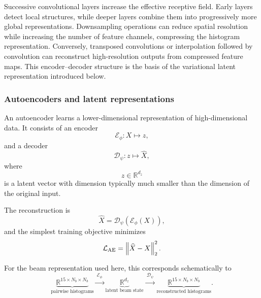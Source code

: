 Successive convolutional layers increase the effective receptive field. Early layers detect local structures, while deeper layers combine them into progressively more global representations. Downsampling operations can reduce spatial resolution while increasing the number of feature channels, compressing the histogram representation. Conversely, transposed convolutions or interpolation followed by convolution can reconstruct high-resolution outputs from compressed feature maps. This encoder--decoder structure is the basis of the variational latent representation introduced below.

\subsubsection{Autoencoders and latent representations}
\label{subsubsec:autoencoder_foundations}

An autoencoder learns a lower-dimensional representation of high-dimensional data. It consists of an encoder
\begin{equation}
    \mathcal{E}_{\phi}
    :
    X
    \longmapsto
    z,
\end{equation}
and a decoder
\begin{equation}
    \mathcal{D}_{\psi}
    :
    z
    \longmapsto
    \widehat{X},
\end{equation}
where
\begin{equation}
    z\in\mathbb{R}^{d_z}
\end{equation}
is a latent vector with dimension typically much smaller than the dimension of the original input.

The reconstruction is
\begin{equation}
    \widehat{X}
    =
    \mathcal{D}_{\psi}
    \left(
    \mathcal{E}_{\phi}(X)
    \right),
\end{equation}
and the simplest training objective minimizes
\begin{equation}
    \mathcal{L}_{\mathrm{AE}}
    =
    \left\lVert
    \widehat{X}
    -
    X
    \right\rVert_{2}^{2}.
\end{equation}

For the beam representation used here, this corresponds schematically to
\begin{equation}
    \underbrace{
    \mathbb{R}^{15\times N_b\times N_b}
    }_{\text{pairwise histograms}}
    \xrightarrow{\ \mathcal{E}_{\phi}\ }
    \underbrace{
    \mathbb{R}^{d_z}
    }_{\text{latent beam state}}
    \xrightarrow{\ \mathcal{D}_{\psi}\ }
    \underbrace{
    \mathbb{R}^{15\times N_b\times N_b}
    }_{\text{reconstructed histograms}}.
    \label{eq:autoencoder_beam_projection}
\end{equation}

